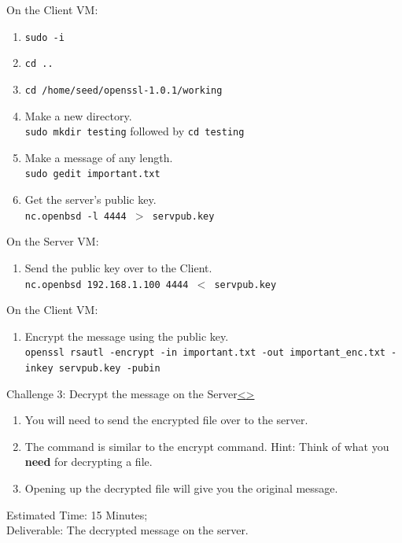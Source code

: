 \documentclass[12pt]{extarticle}
\newenvironment{instructionblock}{\Large\bgroup}{\egroup}
\newcommand{\ben}{\begin{enumerate}}
\newcommand{\een}{\end{enumerate}}
\begin{document}
\noindent
On the Client VM:
\ben
	\item \texttt{sudo -i} 
	\item \texttt{cd ..} 
	\item \texttt{cd /home/seed/openssl-1.0.1/working} 
	\item Make a new directory.\\ 
	\texttt{sudo mkdir testing} followed by \texttt{cd testing} 
	\item Make a message of any length.\\
	\texttt{sudo gedit important.txt} 
	\item Get the server's public key.\\
	\texttt{nc.openbsd -l 4444 $>$ servpub.key} 
\een

\noindent
On the Server VM:
\ben
	\item Send the public key over to the Client. \\
	\texttt{nc.openbsd 192.168.1.100 4444 $<$ servpub.key}
\een

\noindent
On the Client VM:
\ben
	\item Encrypt the message using the public key. \\
	\texttt{openssl rsautl -encrypt -in important.txt -out important\_enc.txt -inkey servpub.key -pubin}
\een


\pagebreak
\begin{slide}{Challenge 3: Decrypt the message on the Server}{\hyperref[slide 16]{\textless}\hyperref[slide 18]{\textgreater}}
	\begin{instructionblock}
		\ben
			\item You will need to send the encrypted file over to the server.
			\item The command is similar to the encrypt command. Hint: Think of what you \textbf{need} for decrypting a file.
			\item Opening up the decrypted file will give you the original message.
		\een
	\end{instructionblock}
\end{slide}
\noindent
Estimated Time: 15 Minutes; \\
Deliverable: The decrypted message on the server.



\end{document}

